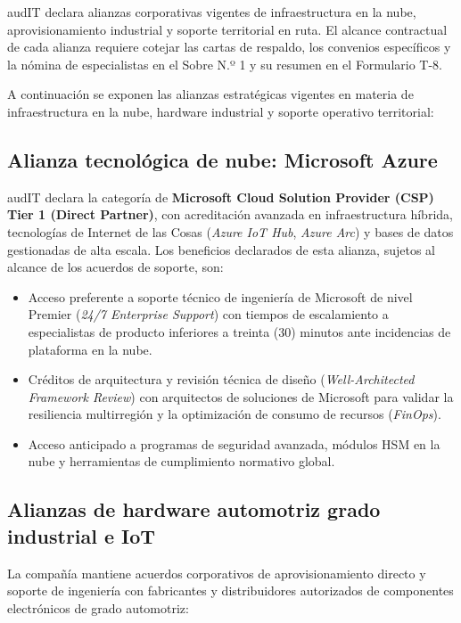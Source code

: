 audIT declara alianzas corporativas vigentes de infraestructura en la nube, aprovisionamiento industrial y soporte territorial en ruta. El alcance contractual de cada alianza requiere cotejar las cartas de respaldo, los convenios específicos y la nómina de especialistas en el Sobre N.º 1 y su resumen en el Formulario T-8.

A continuación se exponen las alianzas estratégicas vigentes en materia de infraestructura en la nube, hardware industrial y soporte operativo territorial:

\subsection{Alianza tecnológica de nube: Microsoft Azure}\label{sec:1-alianza-azure}

audIT declara la categoría de \textbf{Microsoft Cloud Solution Provider (CSP) Tier 1 (Direct Partner)}, con acreditación avanzada en infraestructura híbrida, tecnologías de Internet de las Cosas (\textit{Azure IoT Hub}, \textit{Azure Arc}) y bases de datos gestionadas de alta escala. Los beneficios declarados de esta alianza, sujetos al alcance de los acuerdos de soporte, son:

\begin{itemize}
  \item Acceso preferente a soporte técnico de ingeniería de Microsoft de nivel Premier (\textit{24/7 Enterprise Support}) con tiempos de escalamiento a especialistas de producto inferiores a treinta (30) minutos ante incidencias de plataforma en la nube.
  \item Créditos de arquitectura y revisión técnica de diseño (\textit{Well-Architected Framework Review}) con arquitectos de soluciones de Microsoft para validar la resiliencia multirregión y la optimización de consumo de recursos (\textit{FinOps}).
  \item Acceso anticipado a programas de seguridad avanzada, módulos HSM en la nube y herramientas de cumplimiento normativo global.
\end{itemize}

\subsection{Alianzas de hardware automotriz grado industrial e IoT}\label{sec:1-alianza-hardware}

La compañía mantiene acuerdos corporativos de aprovisionamiento directo y soporte de ingeniería con fabricantes y distribuidores autorizados de componentes electrónicos de grado automotriz:

